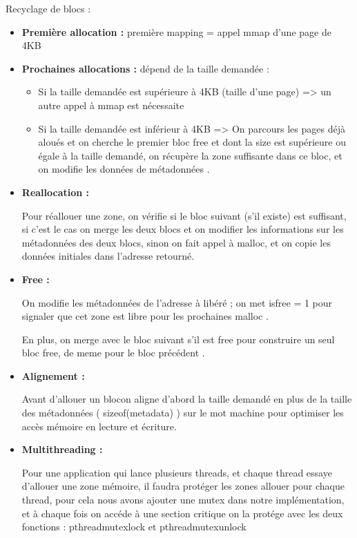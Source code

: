 \documentclass[12pt,a4paper]{article}
\begin{document}
Recyclage de blocs :
\begin{itemize} 

	\item \textbf {Première allocation    :} 
		première mapping = appel mmap d'une page de 4KB

	\item \textbf {Prochaines allocations :} 
		dépend de la taille demandée :

\begin{itemize}
	\item 		 Si la taille demandée est supérieure à 4KB (taille d'une page) => un autre appel à mmap est nécessaite
 
	\item 		 Si la taille demandée est inférieur à 4KB  => On parcours les pages déjà aloués et on cherche le premier bloc free et dont la size est supérieure ou égale à la taille demandé, on récupère la zone suffisante dans ce bloc, et on modifie les données de métadonnées .  
\end{itemize}
\item \textbf {Reallocation :}


	Pour réallouer une zone, on vérifie si le bloc suivant (s'il existe) est suffisant, si c'est le cas on merge les deux blocs et on modifier les informations sur les métadonnées des deux blocs, sinon on fait appel à malloc, et on copie les données initiales dans l'adresse retourné.
\item \textbf {Free :}


	On modifie les métadonnées de l'adresse à libéré ; on met is\textunderscore free = 1 pour signaler que cet zone est libre pour les prochaines malloc .
	
	En plus, on merge avec le bloc suivant s'il est free pour construire un seul bloc free, de meme pour le bloc précédent .
	
\item \textbf {Alignement :}

	
	Avant d'allouer un blocon aligne d'abord la taille demandé en plus de la taille des métadonnées ( sizeof(meta\textunderscore data) ) sur le mot machine pour optimiser les accès mémoire en lecture et écriture.


\item \textbf {Multithreading :}
	
	
	Pour une application qui lance plusieurs threads, et chaque thread essaye d'allouer une zone mémoire, il faudra protéger les zones allouer pour chaque thread, pour cela nous avons ajouter une mutex dans notre implémentation, et à chaque fois on accéde à une section critique on la protége avec les deux fonctions : pthread\textunderscore mutex\textunderscore lock et   pthread\textunderscore mutex\textunderscore unlock 


\end{itemize}
\end{document}
